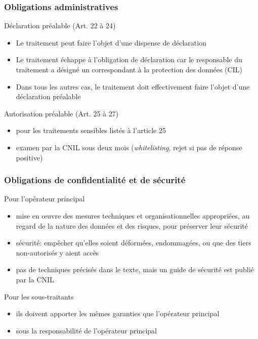 \begin{reveals}
\begin{frame}
  \frametitle{Obligations administratives}
  \vfill
  \begin{block}{Déclaration préalable (Art. 22 à 24)}\small
    \begin{itemize}
    \item Le traitement peut faire l'objet d'une dispense de déclaration
    \item Le traitement échappe à l'obligation de déclaration car le
      responsable du traitement a désigné un correspondant à la
      protection des données (CIL)
    \item Dans tous les autres cas, le traitement doit effectivement
      faire l'objet d'une déclaration préalable
    \end{itemize}
  \end{block}
  \vfill
  \begin{block}{Autorisation préalable (Art. 25 à 27)}\small
    \begin{itemize}
    \item pour les traitements sensibles listés à l'article 25
    \item examen par la CNIL sous deux mois (\emph{whitelisting},
      rejet si pas de réponse positive)
    \end{itemize}
  \end{block}
  \vfill
\end{frame}

\begin{frame}
  \frametitle{Obligations de confidentialité et de sécurité}
  \vfill
  \begin{block}{Pour l'opérateur principal}\small
    \begin{itemize}
    \item mise en \oe uvre des mesures techniques et
      organisationnelles appropriées, au regard de la nature des
      données et des risques, pour préserver leur sécurité
    \item sécurité: empêcher qu'elles soient déformées, endommagées,
      ou que des tiers non-autorisés y aient accès
    \item pas de techniques précisés dans le texte, mais un guide de
      sécurité est publié par la CNIL
    \end{itemize}
  \end{block}
  \vfill
  \begin{block}{Pour les sous-traitants}\small
    \begin{itemize}
    \item ils doivent apporter les mêmes garanties que l'opérateur principal
    \item sous la responsabilité de l'opérateur principal
    \end{itemize}
  \end{block}
  \vfill
\end{frame}


\end{reveals}
